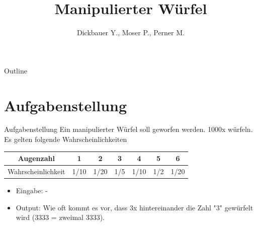 

\title[BSP06 - Manipulierter Würfel]{Manipulierter Würfel}
\author{Dickbauer Y., Moser P., Perner M.}



\begin{frame}
  \titlepage
\end{frame}

\begin{frame}{Outline}
  \tableofcontents
\end{frame}

\section{Aufgabenstellung}
\begin{frame}{Aufgabenstellung}
Ein manipulierter Würfel soll geworfen werden. 1000x würfeln. Es gelten folgende Wahrscheinlichkeiten
\begin{center}
\begin{tabular}{c|c|c|c|c|c|c}
Augenzahl & 1 & 2 & 3 & 4 & 5 & 6 \\ 
\hline 
Wahrscheinlichkeit & 1/10 & 1/20 & 1/5 & 1/10 & 1/2 & 1/20 \\ 
\end{tabular} 
\end{center}
\begin{itemize}
  \item Eingabe: -
  \item Output: Wie oft kommt es vor, dass 3x hintereinander die Zahl "3" gewürfelt wird (3333 = zweimal 3333).
\end{itemize}

\end{frame}

